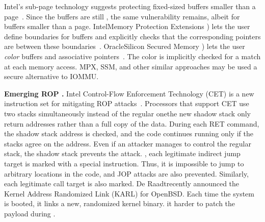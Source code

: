 Intel’s sub-page \DIFdelbegin {}\DIFdelend \DIFaddbegin {}\DIFaddend technology suggests protecting fixed-sized buffers smaller than a page~\cite{Int18}. Since the buffers are still \DIFdelbegin {}\DIFdelend \DIFaddbegin {}\DIFaddend , the same vulnerability remains, albeit for buffers smaller than a page. Intel\DIFdelbegin {}\DIFdelend \DIFaddbegin {}\DIFaddend Memory Protection Extensions \DIFaddbegin {}\DIFaddend ) lets the user define boundaries for buffers and \DIFdelbegin {}\DIFdelend \DIFaddbegin {}\DIFaddend explicitly checks that the corresponding pointers are between these boundaries~\cite{Int16a}. Oracle\DIFdelbegin {}\DIFdelend \DIFaddbegin {}\DIFaddend Silicon Secured Memory \DIFaddbegin {}\DIFaddend ) lets the user \emph{color} buffers and associative pointers~\cite{Ora15}. The color is implicitly checked for a match at each memory access. MPX, SSM, and other similar approaches may be used \DIFdelbegin {}\DIFdelend \DIFaddbegin {}\DIFaddend a secure alternative to IOMMU. 

\smallskip
\noindent\textbf{Emerging ROP \DIFdelbegin {}\DIFdelend \DIFaddbegin {}\DIFaddend .}
Intel Control-Flow Enforcement Technology (CET) is a new instruction set for mitigating ROP attacks~\cite{Int17}. Processors that support CET use two stacks simultaneously instead of the regular one\DIFdelbegin {}\DIFdelend \DIFaddbegin \DIFadd{; }\DIFaddend the new shadow stack \DIFdelbegin {}\DIFdelend \DIFaddbegin {}\DIFaddend only return addresses rather than a full copy of the data. During each RET command, the shadow stack address is checked, and the code continues running only if the stacks agree on the address. Even if an attacker manages to control the regular stack, the shadow stack prevents the attack. \DIFdelbegin {}\DIFdelend \DIFaddbegin {}\DIFaddend , each legitimate indirect jump target is marked with a special instruction. Thus, it is impossible to jump to arbitrary locations in the code, and JOP attacks are also prevented. Similarly, each legitimate call target is also marked. De Raadt\DIFaddbegin {}\DIFaddend recently announced the Kernel Address Randomized Link (KARL) for OpenBSD\DIFdelbegin {}\DIFdelend . Each time the system is booted, it links a new, randomized kernel binary. \DIFdelbegin {}\DIFdelend \DIFaddbegin {}\DIFaddend it harder to patch the payload during \DIFdelbegin {}\DIFdelend \DIFaddbegin {}\DIFaddend . 

